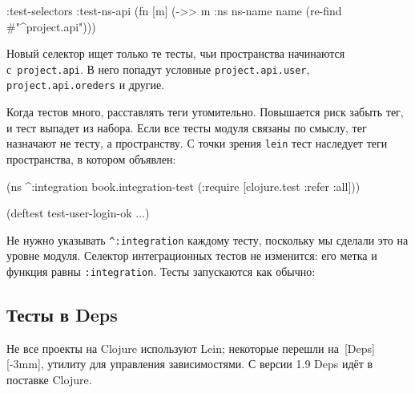 \else

\begin{english}
  \begin{clojure}
:test-selectors {:test-ns-api
                 (fn [m] (->> m :ns ns-name name
                              (re-find #"^project.api")))}
  \end{clojure}
\end{english}

\fi

Новый селектор ищет только те тесты, чьи пространства начинаются
с~\verb|project.api|. В него попадут условные \verb|project.api.user|,
\verb|project.api.oreders| и другие.

Когда тестов много, расставлять теги утомительно. Повышается риск забыть тег, и
тест выпадет из набора. Если все тесты модуля связаны по смыслу, тег назначают
не тесту, а пространству. С точки зрения \verb|lein| тест наследует теги
пространства, в котором объявлен:

\begin{english}
  \begin{clojure}
(ns ^:integration
  book.integration-test
  (:require [clojure.test :refer :all]))

(deftest test-user-login-ok
  ...)
  \end{clojure}
\end{english}

Не нужно указывать \verb|^:integration| каждому тесту, поскольку мы сделали
это на уровне модуля. Селектор интеграционных тестов не изменится: его метка и
функция равны \verb|:integration|. Тесты запускаются как обычно:

\begin{english}
\end{english}

\subsection{Тесты в Deps}


Не все проекты на Clojure используют Lein; некоторые перешли
на~[Deps][-3mm], утилиту для
управления зависимостями. С версии 1.9 Deps идёт в поставке Clojure.


